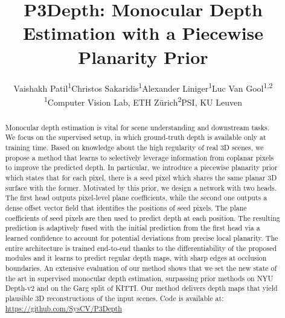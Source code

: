\documentclass[final]{cvpr}
\begin{document}
\title{P3Depth: Monocular Depth Estimation with a Piecewise Planarity Prior}

\author{
Vaishakh Patil\textsuperscript{1}\space\space\space\space Christos Sakaridis\textsuperscript{1}\space\space\space\space Alexander Liniger\textsuperscript{1}\space\space\space\space Luc Van Gool\textsuperscript{1,2}\vspace{6px} \\
\textsuperscript{1}Computer Vision Lab, ETH Z\"urich\space\space\space\space \textsuperscript{2}PSI, KU Leuven\\
 }


 \maketitle

\begin{abstract}
\vspace{-0.2cm}
Monocular depth estimation is vital for scene understanding and downstream tasks. We focus on the supervised setup, in which ground-truth depth is available only at training time. Based on knowledge about the high regularity of real 3D scenes, we propose a method that learns to selectively leverage information from coplanar pixels to improve the predicted depth. In particular, we introduce a piecewise planarity prior which states that for each pixel, there is a seed pixel which shares the same planar 3D surface with the former. Motivated by this prior, we design a network with two heads. The first head outputs pixel-level plane coefficients, while the second one outputs a dense offset vector field that identifies the positions of seed pixels. The plane coefficients of seed pixels are then used to predict depth at each position. The resulting prediction is adaptively fused with the initial prediction from the first head via a learned confidence to account for potential deviations from precise local planarity. The entire architecture is trained end-to-end thanks to the differentiability of the proposed modules and it learns to predict regular depth maps, with sharp edges at occlusion boundaries. An extensive evaluation of our method shows that we set the new state of the art in supervised monocular depth estimation, surpassing prior methods on NYU Depth-v2 and on the Garg split of KITTI. Our method delivers depth maps that yield plausible 3D reconstructions of the input scenes. Code is available at: \url{https://github.com/SysCV/P3Depth}
\end{abstract}
\vspace{-0.3cm}
\end{document}
